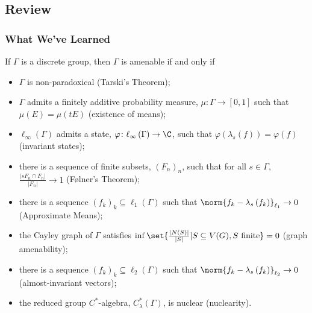 \documentclass{beamer-custom}
\begin{document}
\subsection{Review}%
\begin{frame}
  \frametitle{What We've Learned}
  \small
  If $\Gamma$ is a discrete group, then $\Gamma$ is amenable if and only if\pause
  \begin{itemize}
    \item $\Gamma$ is non-paradoxical (Tarski's Theorem);\pause
    \item $\Gamma$ admits a finitely additive probability measure, $\mu\colon \Gamma\rightarrow [0,1]$ such that $\mu\left( E \right) = \mu\left( tE \right)$ (existence of means);\pause
    \item $\ell_{\infty}\left( \Gamma \right)$ admits a state, $\varphi\colon \ell_{\infty}\left( \Gamma \right)\rightarrow \C$, such that $\varphi\left( \lambda_s(f) \right) = \varphi\left( f \right)$ (invariant states);\pause
    \item there is a sequence of finite subsets, $\left( F_n \right)_n$, such that for all $s\in\Gamma$, $\frac{\left\vert sF_n\cap F_n \right\vert}{\left\vert F_n \right\vert} \rightarrow 1$ (Følner's Theorem);\pause
    \item there is a sequence $\left( f_k \right)_k\subseteq \ell_1\left( \Gamma \right)$ such that $\norm{f_k - \lambda_s\left(f_k\right)}_{\ell_1}\rightarrow 0$ (Approximate Means);\pause
    \item the Cayley graph of $\Gamma$ satisfies $\inf\set{\frac{\left\vert N(S) \right\vert}{\left\vert S \right\vert} | S\subseteq V(G),S\text{ finite}} = 0$ (graph amenability);\pause
    \item there is a sequence $\left( f_k \right)_k\subseteq \ell_2\left( \Gamma \right)$ such that $\norm{f_k - \lambda_s\left(f_k\right)}_{\ell_2} \rightarrow 0$ (almost-invariant vectors);\pause
    \item the reduced group $C^{\ast}$-algebra, $C^{\ast}_{\lambda}\left( \Gamma \right)$, is nuclear (nuclearity).
  \end{itemize}
\end{frame}
\end{document}
